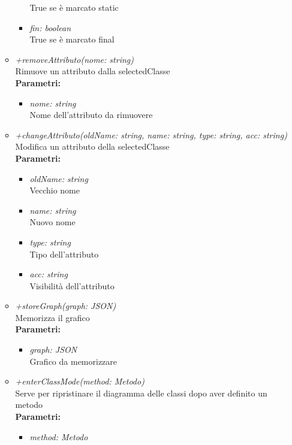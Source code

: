 \begin{itemize}
\begin{itemize}
\begin{itemize}
    			True se è marcato static
    			\item \emph{fin: boolean}\\
    			True se è marcato final
    		\end{itemize}
    		\item \emph{+removeAttributo(nome: string)}\\
    		Rimuove un attributo dalla selectedClasse\\
    		\textbf{Parametri:}
    		\begin{itemize}
    			\item \emph{nome: string}\\
    			Nome dell'attributo da rimuovere
    		\end{itemize}
    		\item \emph{+changeAttributo(oldName: string, name: string, type: string, acc: string)}\\
    		Modifica un attributo della selectedClasse\\
    		\textbf{Parametri:}
    		\begin{itemize}
    			\item \emph{oldName: string}\\
    			Vecchio nome
    			\item \emph{name: string}\\
    			Nuovo nome
    			\item \emph{type: string}\\
    			Tipo dell'attributo
    			\item \emph{acc: string}\\
    			Visibilità dell'attributo
    		\end{itemize}
    		\item \emph{+storeGraph(graph: JSON)}\\
    		Memorizza il grafico\\
    		\textbf{Parametri:}
    		\begin{itemize}
    			\item \emph{graph: JSON}\\
    			Grafico da memorizzare
    		\end{itemize}
    		\item \emph{+enterClassMode(method: Metodo)}\\
    		Serve per ripristinare il diagramma delle classi dopo aver definito un metodo\\
    		\textbf{Parametri:}
    		\begin{itemize}
    			\item \emph{method: Metodo}\\

\end{itemize}
\end{itemize}
\end{itemize}
